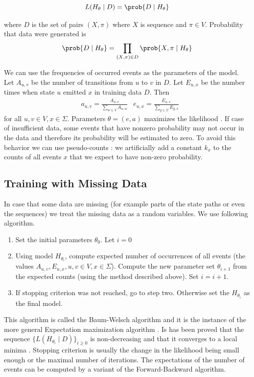 \[L(H_\theta\mid D)=\prob{D\mid H_\theta}\]

where $D$ is the set of pairs $(X,\pi)$ where $X$ is sequence and $\pi\in
V$. Probability that data
were generated is
\[
\prob{D\mid H_\theta} = \prod_{(X,\pi)\in D}\prob{X,\pi\mid H_\theta}
\]


We can use the frequencies of occurred events as the parameters of the model.
Let $A_{u,v}$ be the number of transitions from $u$ to $v$ in $D$.
Let $E_{u,x}$ be the number times when state $u$ emitted $x$ in training data
$D$.
Then 
\begin{align*}
&a_{u,v}=\frac{A_{u,v}}{\sum_{w\in V}A_{u,w}}
&e_{u,x}=\frac{E_{u,x}}{\sum_{y\in\Sigma}E_{y,x}}
\end{align*}
for all $u,v\in V, x\in\Sigma$. Parameters $\theta=(e,a)$ maximizes the likelihood
\cite{Durbin1998}. If case of insufficient data, some events that have
nonzero probability may not occur in the data and therefore its probability will be
estimated to zero. To avoid this behavior we can use pseudo-counts
\cite{Durbin1998}: we artificially add a constant $k_x$ to the counts of all
events $x$ that we expect to have non-zero probability.

\subsection{Training with Missing Data} 
In case that some data are missing (for example parts
of the state paths or even the sequences) we treat the missing data as a random
variables. We use following algorithm. 
\begin{enumerate}
\item  Set the initial parameters $\theta_0$. Let $i=0$
\item  Using model $H_{\theta_i}$, compute expected number of occurrences of
all events (the values $A_{u,v}, E_{u,x}, u,v\in V,x\in\Sigma$). Compute the new
parameter set $\theta_{i+1}$ from the expected counts (using the method
described above). Set $i=i+1$.
\item If stopping criterion was not reached, go to step two. Otherwise 
set the $H_{\theta_{i}}$ as the final model.
\end{enumerate}
This algorithm is called the Baum-Welsch algorithm and it is the instance of the
more general Expectation maximization algorithm \cite{Durbin1998}. Is has been
proved that the sequence $\{L(H_{\theta_i}\mid D)\}_{i\geq 0}$ is non-decreasing and
that it converges to a local minima \cite{Durbin1998}. Stopping criterion is
usually  the change in the likelihood being small enough or the maximal number of
iterations.
 The expectations of the number of events can be
computed by a variant of the Forward-Backward algorithm.

